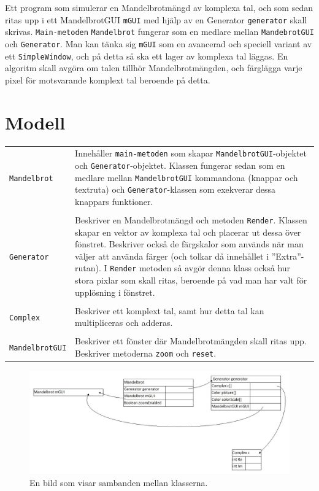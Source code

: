 \documentclass[a4paper]{article}
\newcommand{\code}[1]{\texttt{#1}} %
\begin{document}
\vspace{\baselineskip}
Ett program som simulerar en Mandelbrotmängd av komplexa tal, och som sedan ritas upp i ett MandelbrotGUI \texttt{mGUI} med hjälp av en Generator \texttt{generator} skall skrivas.
\texttt{Main-metoden} \texttt{Mandelbrot} fungerar som en medlare mellan \texttt{MandebrotGUI} och \texttt{Generator}.
Man kan tänka sig \texttt{mGUI} som en avancerad och speciell variant av ett \texttt{SimpleWindow}, och på detta så ska ett lager av komplexa tal läggas. En algoritm skall avgöra om talen tillhör Mandelbrotmängden, och färglägga varje pixel för motsvarande komplext tal beroende på detta.


\section{Modell}
\vspace{7 mm}
\begin{tabular}{lp{8cm}}
\code{Mandelbrot} & Innehåller \code{main-metoden} som skapar \texttt{MandelbrotGUI}-objektet och \texttt{Generator}-objektet. Klassen fungerar sedan som en medlare mellan \texttt{MandelbrotGUI} kommandona (knappar och textruta) och \texttt{Generator}-klassen som exekverar dessa knappars funktioner.\\\\
\code{Generator} & Beskriver en Mandelbrotmängd och metoden \texttt{Render}. Klassen skapar en vektor av komplexa tal och placerar ut dessa över fönstret.
Beskriver också de färgskalor som används när man väljer att använda färger (och tolkar då innehållet i ''Extra''-rutan). I \texttt{Render} metoden så avgör denna klass också hur stora pixlar som skall ritas, beroende på vad man har valt för upplösning i fönstret.\\\\
\code{Complex} & Beskriver  ett komplext tal, samt hur detta tal kan multipliceras och adderas.\\\\
\code{MandelbrotGUI} & Beskriver ett fönster där Mandelbrotmängden skall ritas upp. Beskriver metoderna \texttt{zoom} och \texttt{reset}.
\end{tabular}

\begin{figure}
\begin{center}
\includegraphics[scale=0.4]{Mandelbrotmap.pdf}
\end{center}
\caption{En bild som visar sambanden mellan klasserna.}
\label{Bild 3}
\end{figure}
\end{document}

